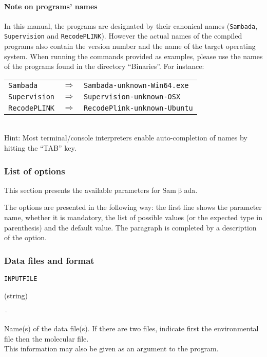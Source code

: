 \documentclass[a4paper,11pt]{article}
\newcommand{\versionnumber}{unknown}
\newcommand{\smb}{\textsf{Sam$\upbeta$ada}}
\newcommand{\prog}[1]{\texttt{#1}}
\newcommand\textline[6][t]{%
\par\smallskip\noindent\parbox[#1]
{2.5cm}{\raggedright
\texttt{\large #2}}%
\parbox[#1]{\dimexpr .5\textwidth - 2.5cm}
{\ifthenelse{\equal{#3}{M}}{Mandatory}{Optional}}
\parbox[#1]{.25\textwidth}
{\centering#4}%
\parbox[#1]{.25\textwidth}
{\raggedleft\texttt{#5}}
\par\smallskip\noindent\hspace{\dimexpr 2.5cm }
\begin{minipage}{\dimexpr\textwidth - 2.5cm }
#6
\end{minipage}%
\bigskip
}
\begin{document}
\paragraph{Note on programs' names} 
In this manual, the programs are designated by their canonical names (\prog{Sambada}, \prog{Supervision} and \prog{RecodePLINK}).
However the actual names of the compiled programs also contain the version number and the name of the target operating system.
When running the commands provided as examples, please use the names of the programs found in the directory \enquote{Binaries}.
For instance: \\
\begin{tabular}{lll}
\prog{Sambada}		& $\Rightarrow$ & \prog{Sambada-\versionnumber-Win64.exe}	\\
\prog{Supervision}		& $\Rightarrow$ & \prog{Supervision-\versionnumber-OSX}		\\
\prog{RecodePLINK}	& $\Rightarrow$ & \prog{RecodePlink-\versionnumber-Ubuntu}	 \\
\end{tabular} \\
Hint: Most terminal/console interpreters enable auto-completion of names by hitting the \enquote{TAB} key.

\subsubsection{List of options\label{seq:liste-options}}

This section presents the available parameters for \smb.



The options are presented in the following way: the first line shows the parameter
name, whether it is mandatory, the list of possible values (or the
expected type in parenthesis) and the default value.
The paragraph is completed by a description of the option.

\subsubsection*{Data files and format}
\textline{INPUTFILE}{O}{(string)}{-}
{Name(s) of the data file(s). If there are two files, indicate first the environmental file then the molecular file.\\ This information may also be given as an argument to the program.}
\end{document}
